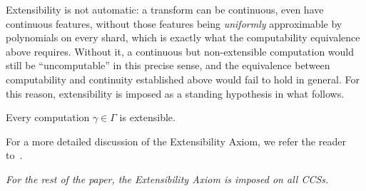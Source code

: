 Extensibility is not automatic: a transform can be continuous, even have continuous features, without those features being \emph{uniformly} approximable by polynomials on every shard, which is exactly what the computability equivalence above requires.
Without it, a continuous but non-extensible computation would still be ``uncomputable'' in this precise sense, and the equivalence between computability and continuity established above would fail to hold in general.
For this reason, extensibility is imposed as a standing hypothesis in what follows.

\begin{AxExt}\label{ax:extensibility-axiom}
    Every computation $\gamma\in\Gamma$ is extensible.
\end{AxExt}

For a more detailed discussion of the Extensibility Axiom, we refer the reader to~\cite{alva2024approximability}.

\emph{For the rest of the paper, the Extensibility Axiom is imposed on all CCSs.}